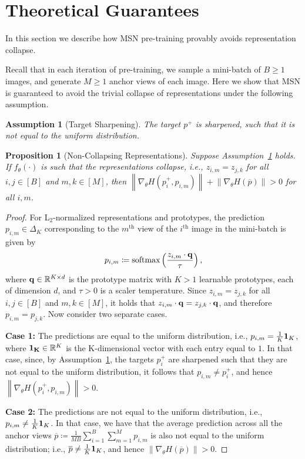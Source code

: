 \documentclass{article}
\newcommand{\norm}[1]{\left\lVert#1\right\rVert}
\newcommand{\defeq}{\coloneqq}
\newtheorem{proposition}{Proposition}
\newtheorem{assumption}{Assumption}
\newcommand{\R}{\mathbb{R}}
\begin{document}
\section{Theoretical Guarantees}
\label{apndx:theory}

In this section we describe how MSN pre-training provably avoids representation collapse.

Recall that in each iteration of pre-training, we sample a mini-batch of $B \geq 1$ images, and generate $M \geq 1$ anchor views of each image.
Here we show that MSN is guaranteed to avoid the trivial collapse of representations under the following assumption.

\begin{assumption}[Target Sharpening]
\label{ass:sharp}
The target $p^+$ is sharpened, such that it is not equal to the uniform distribution.
\end{assumption}
\begin{proposition}[Non-Collapsing Representations]
\label{prop:collapse}
Suppose Assumption~\ref{ass:sharp} holds.
If $f_\theta(\cdot)$ is such that the representations collapse, i.e., $z_{i,m} = z_{j,k}$ for all $i,j \in [B]$ and $m,k \in [M]$, then $\norm{\nabla_\theta H(p^+_{i}, p_{i,m})} + \norm{\nabla_\theta H(\overline{p})} > 0$ for all $i,m$.
\end{proposition}
\begin{proof}
For L$_2$-normalized representations and prototypes, the prediction $p_{i,m} \in \Delta_K$ corresponding to the $m^{\text{th}}$ view of the $i^{\text{th}}$ image in the mini-batch is given by
\[
    p_{i,m} \defeq \text{softmax}\left( \frac{z_{i,m} \cdot {\bf q}}{\tau} \right),
\]
where ${\bf q} \in \R^{K \times d}$ is the prototype matrix with $K > 1$ learnable prototypes, each of dimension $d$, and $\tau > 0$ is a scaler temperature.
Since $z_{i,m} = z_{j,k}$ for all $i,j \in [B]$ and $m,k \in [M]$, it holds that $z_{i,m} \cdot {\bf q} = z_{j,k} \cdot {\bf q}$, and therefore $p_{i,m} = p_{j,k}$.
Now consider two separate cases.

{\bf Case 1:} The predictions are equal to the uniform distribution, i.e., $p_{i,m} = \frac{1}{K} {\bf 1}_K$, where ${\bf 1_K} \in \R^K$ is the K-dimensional vector with each entry equal to $1$. In that case, since, by Assumption~\ref{ass:sharp}, the targets $p^+_{i}$ are sharpened such that they are not equal to the uniform distribution, it follows that $p_{i,m} \neq p^+_{i}$, and hence $\norm{\nabla_\theta H(p^+_{i},p_{i,m})} > 0$.

{\bf Case 2:} The predictions are not equal to the uniform distribution, i.e., $p_{i,m} \neq \frac{1}{K} {\bf 1}_K$. In that case, we have that the average prediction across all the anchor views $\overline{p} \defeq \frac{1}{MB}\sum^B_{i=1}\sum^M_{m=1} p_{i,m}$ is also not equal to the uniform distribution; i.e., $\overline{p} \neq \frac{1}{K}{\bf 1}_K$, and hence $\norm{\nabla_\theta H(\overline{p})} > 0$.
\end{proof}
\end{document}
